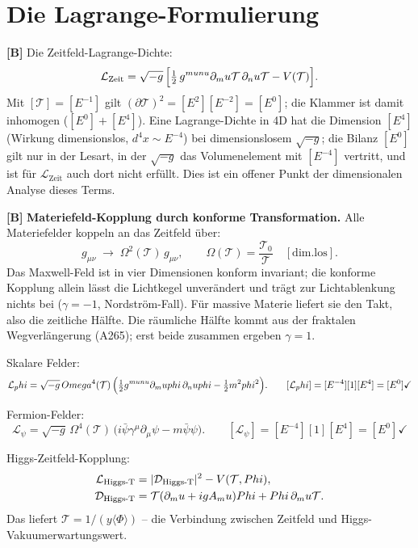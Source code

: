 \section{Die Lagrange-Formulierung}

\textbf{[B]} Die Zeitfeld-Lagrange-Dichte:
\[
  \mathcal L_\text{Zeit}
  = \sqrt{-g}\,\Bigl[
    \tfrac12\,g^{\mu\nu}\partial_\mu\mathcal T\,\partial_\nu\mathcal T
    - V(\mathcal T)
  \Bigr].
\]
Mit $[\mathcal T]=[E^{-1}]$ gilt $(\partial\mathcal T)^2=[E^2][E^{-2}]=[E^0]$; die Klammer ist damit inhomogen ($[E^0]+[E^4]$). Eine Lagrange-Dichte in 4D hat die Dimension $[E^4]$ (Wirkung dimensionslos, $d^4x\sim E^{-4}$) bei dimensionslosem $\sqrt{-g}$; die Bilanz $[E^0]$ gilt nur in der Lesart, in der $\sqrt{-g}$ das Volumenelement mit $[E^{-4}]$ vertritt, und ist für $\mathcal L_\text{Zeit}$ auch dort nicht erfüllt. Dies ist ein offener Punkt der dimensionalen Analyse dieses Terms.

\textbf{[B]} \textbf{Materiefeld-Kopplung durch konforme Transformation.} Alle
Materiefelder koppeln an das Zeitfeld über:
\[
  g_{\mu\nu}\;\to\;\Omega^2(\mathcal T)\,g_{\mu\nu},
  \qquad\Omega(\mathcal T)=\frac{\mathcal T_0}{\mathcal T}\quad[\text{dim.los}].
\]
Das Maxwell-Feld ist in vier Dimensionen konform invariant; die konforme Kopplung allein lässt die Lichtkegel unverändert und trägt zur Lichtablenkung nichts bei ($\gamma=-1$, Nordström-Fall). Für massive Materie liefert sie den Takt, also die zeitliche Hälfte. Die räumliche Hälfte kommt aus der fraktalen Wegverlängerung (A265); erst beide zusammen ergeben $\gamma=1$.

Skalare Felder:
\[
  \mathcal L_\phi
  = \sqrt{-g}\,\Omega^4(\mathcal T)\,
    \Bigl(\tfrac12 g^{\mu\nu}\partial_\mu\phi\,\partial_\nu\phi
    - \tfrac12 m^2\phi^2\Bigr).
  \qquad [\mathcal L_\phi]=[E^{-4}][1][E^4]=[E^0]\checkmark
\]

Fermion-Felder:
\[
  \mathcal L_\psi
  = \sqrt{-g}\,\Omega^4(\mathcal T)\,
    \bigl(i\bar\psi\gamma^\mu\partial_\mu\psi - m\bar\psi\psi\bigr).
  \qquad [\mathcal L_\psi]=[E^{-4}][1][E^4]=[E^0]\checkmark
\]

Higgs-Zeitfeld-Kopplung:
\begin{align}
  \mathcal L_{\text{Higgs-T}}
  &= |\mathcal D_{\text{Higgs-T}}|^2 - V(\mathcal T,\Phi), \notag\\
  \mathcal D_{\text{Higgs-T}}
  &= \mathcal T(\partial_\mu+igA_\mu)\Phi
    + \Phi\,\partial_\mu\mathcal T. \notag
\end{align}
Das liefert $\mathcal T=1/(y\langle\Phi\rangle)$ -- die Verbindung zwischen
Zeitfeld und Higgs-Vakuumerwartungswert.

